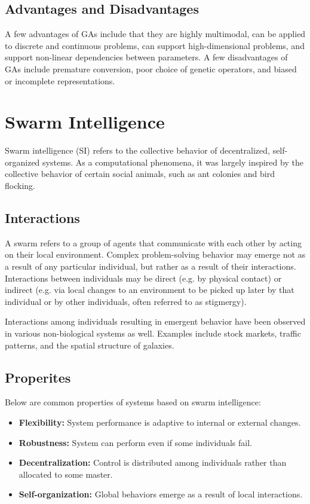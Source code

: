\documentclass[12pt,titlepage]{article}
\begin{document}
    \subsection{Advantages and Disadvantages}
      A few advantages of GAs include that they are highly multimodal, can be applied to discrete and continuous problems, can support high-dimensional
      problems, and support non-linear dependencies between parameters. A few disadvantages of GAs include premature conversion, poor choice of genetic
      operators, and biased or incomplete representations.

  \newpage

  \section{Swarm Intelligence}

    Swarm intelligence (SI) refers to the collective behavior of decentralized, self-organized systems. As a computational phenomena, it was largely
    inspired by the collective behavior of certain social animals, such as ant colonies and bird flocking.

    \subsection{Interactions}
      A swarm refers to a group of agents that communicate with each other by acting on their local environment. Complex problem-solving behavior may
      emerge not as a result of any particular individual, but rather as a result of their interactions. Interactions between individuals may be direct
      (e.g. by physical contact) or indirect (e.g. via local changes to an environment to be picked up later by that individual or by other individuals,
      often referred to as stigmergy).

      Interactions among individuals resulting in emergent behavior have been observed in various non-biological systems as well. Examples include
      stock markets, traffic patterns, and the spatial structure of galaxies.

    \subsection{Properites}
      Below are common properties of systems based on swarm intelligence:
      \begin{itemize}
        \item \textbf{Flexibility:} System performance is adaptive to internal or external changes.
        \item \textbf{Robustness:} System can perform even if some individuals fail.
        \item \textbf{Decentralization:} Control is distributed among individuals rather than allocated to some master.
        \item \textbf{Self-organization:} Global behaviors emerge as a result of local interactions.
      \end{itemize}
\end{document}
